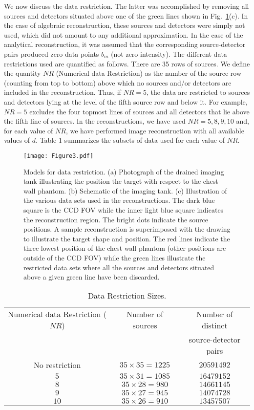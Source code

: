 We now discuss the data restriction. The latter was accomplished by removing all sources and detectors situated above one of the green lines shown in Fig.~\ref{fig:data}(c). In the case of algebraic reconstruction, these sources and detectors were simply not used, which did not amount to any additional approximation. In the case of the analytical reconstruction, it was assumed that the corresponding source-detector pairs produced zero data points $b_m$ (not zero intensity). The different data restrictions used are quantified as follows. There are 35 rows of sources. We define the quantity $NR$
(Numerical data Restriction) as the number of the source row (counting from top to bottom) above which no sources and/or detectors are included in the reconstruction.  Thus, if $NR=5$, the data are restricted to sources and detectors lying at the level of the fifth source row and below it. For example, $NR=5$ excludes the four topmost lines of sources and all detectors that lie above the fifth line of
sources. In the reconstructions, we have used $NR=5, 8, 9, 10$ and, for each value of $NR$, we have performed image reconstruction with all available values of $d$. Table 1 summarizes the subsets of data
used for each value of $NR$.

\begin{figure}[htbp]
\centering\texttt{[image: Figure3.pdf]}
\caption{\label{fig:data}
  Models for data restriction. (a) Photograph of the drained imaging tank illustrating the position the target with respect to the chest wall phantom. (b) Schematic of the imaging tank. (c) Illustration of  the various data sets used in the reconstructions. The dark blue square is the CCD FOV while the inner light blue square indicates the reconstruction region. The bright dots indicate the source positions. A sample reconstruction is superimposed with the drawing to illustrate the target shape and position. The red lines indicate the three lowest position of the chest wall phantom (other positions are outside of the CCD FOV) while the green lines illustrate the restricted data sets where all the sources and detectors situated above a given green line have been discarded.}
\end{figure}

\begin{table}[t]
\centering\caption{Data Restriction Sizes.}
\begin{tabular}{c|c|c}
\hline 
Numerical data Restriction ($NR$) & Number of sources & 
Number of distinct \\
&& source-detector pairs \\ \hline
No restriction & $35\times35=1225$ & $20591492$ \\
           $5$ & $35\times31=1085$ & $16479152$ \\
           $8$ & $35\times28=980$  & $14661145$ \\
           $9$ & $35\times27=945$  & $14074728$ \\
          $10$ & $35\times26=910$  & $13457507$ \\ \hline
\end{tabular}
\end{table}


